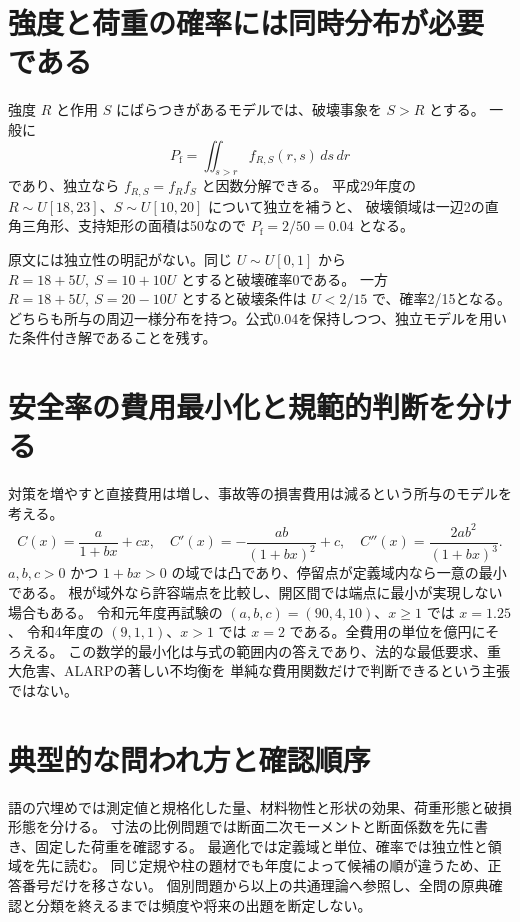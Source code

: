 \section{強度と荷重の確率には同時分布が必要である}
\label{theory:structural:reliability}
強度 \(R\) と作用 \(S\) にばらつきがあるモデルでは、破壊事象を \(S>R\) とする。
一般に
\[
 P_{\mathrm f}=\iint_{s>r} f_{R,S}(r,s)\,ds\,dr
\]
であり、独立なら \(f_{R,S}=f_R f_S\) と因数分解できる。
平成29年度の \(R\sim U[18,23]\)、\(S\sim U[10,20]\) について独立を補うと、
破壊領域は一辺2の直角三角形、支持矩形の面積は50なので \(P_{\mathrm f}=2/50=0.04\) となる。
\begin{tcolorbox}[title=周辺分布だけでは決まらない]
原文には独立性の明記がない。同じ \(U\sim U[0,1]\) から
\(R=18+5U,\ S=10+10U\) とすると破壊確率0である。
一方 \(R=18+5U,\ S=20-10U\) とすると破壊条件は \(U<2/15\) で、確率2/15となる。
どちらも所与の周辺一様分布を持つ。公式0.04を保持しつつ、独立モデルを用いた条件付き解であることを残す。
\end{tcolorbox}

\section{安全率の費用最小化と規範的判断を分ける}
\label{theory:structural:optimization}
対策を増やすと直接費用は増し、事故等の損害費用は減るという所与のモデルを考える。
\[
 C(x)=\frac{a}{1+bx}+cx,\quad
 C'(x)=-\frac{ab}{(1+bx)^2}+c,\quad
 C''(x)=\frac{2ab^2}{(1+bx)^3}.
\]
\(a,b,c>0\) かつ \(1+bx>0\) の域では凸であり、停留点が定義域内なら一意の最小である。
根が域外なら許容端点を比較し、開区間では端点に最小が実現しない場合もある。
令和元年度再試験の \((a,b,c)=(90,4,10)\)、\(x\ge1\) では \(x=1.25\)、
令和4年度の \((9,1,1)\)、\(x>1\) では \(x=2\) である。全費用の単位を億円にそろえる。
この数学的最小化は与式の範囲内の答えであり、法的な最低要求、重大危害、ALARPの著しい不均衡を
単純な費用関数だけで判断できるという主張ではない。

\section{典型的な問われ方と確認順序}
語の穴埋めでは測定値と規格化した量、材料物性と形状の効果、荷重形態と破損形態を分ける。
寸法の比例問題では断面二次モーメントと断面係数を先に書き、固定した荷重を確認する。
最適化では定義域と単位、確率では独立性と領域を先に読む。
同じ定規や柱の題材でも年度によって候補の順が違うため、正答番号だけを移さない。
個別問題から以上の共通理論へ参照し、全問の原典確認と分類を終えるまでは頻度や将来の出題を断定しない。

